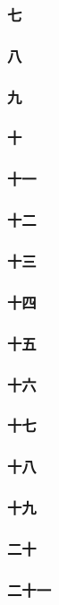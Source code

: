 \subsubsection*{七}
\subsubsection*{八}
\subsubsection*{九}
\subsubsection*{十}
\subsubsection*{十一}
\subsubsection*{十二}
\subsubsection*{十三}
\subsubsection*{十四}
\subsubsection*{十五}
\subsubsection*{十六}
\subsubsection*{十七}
\subsubsection*{十八}
\subsubsection*{十九}
\subsubsection*{二十}
\subsubsection*{二十一}
